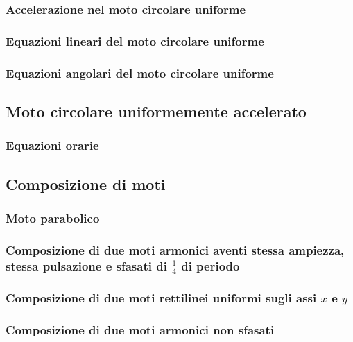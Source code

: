 \subsubsection{Accelerazione nel moto circolare uniforme}
\subsubsection{Equazioni lineari del moto circolare uniforme}
\subsubsection{Equazioni angolari del moto circolare uniforme}
\subsection{Moto circolare uniformemente accelerato}
\subsubsection{Equazioni orarie}
\subsection{Composizione di moti}
\subsubsection{Moto parabolico}
\subsubsection{Composizione di due moti armonici aventi stessa ampiezza, stessa pulsazione e sfasati di $\frac{1}{4}$ di periodo}
\subsubsection{Composizione di due moti rettilinei uniformi sugli assi $x$ e $y$}
\subsubsection{Composizione di due moti armonici non sfasati}